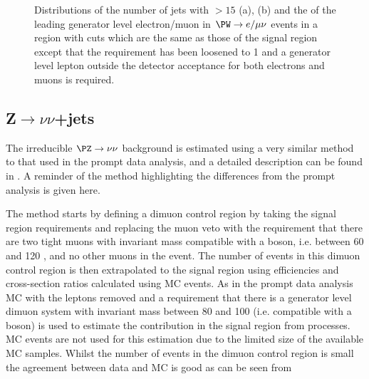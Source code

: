 \begin{figure}
  \caption{Distributions of the number of jets with \pt$>15$ \GeV (a), \jetmetdphi (b) and the \pt of the leading generator level electron/muon in $\PW\rightarrow e/\mu\nu$ events in a region with cuts which are the same as those of the signal region except that the \jetmetdphi requirement has been loosened to 1 and a generator level lepton outside the detector acceptance for both electrons and muons is required.}
  \label{fig:enumunudiff}
\end{figure}

\subsection{Z$\rightarrow \nu\nu$+jets}
\label{sec:parkedznunu}
The irreducible $\PZ\rightarrow\nu\nu$ background is estimated using a very similar method to that used in the prompt data analysis, and a detailed description can be found in . A reminder of the method highlighting the differences from the prompt analysis is given here.

The method starts by defining a dimuon control region by taking the signal region requirements and replacing the muon veto with the requirement that there are two tight muons with invariant mass compatible with a \PZ boson, i.e. between 60 and 120 \GeV, and no other muons in the event. The number of events in this dimuon control region is then extrapolated to the signal region using efficiencies and cross-section ratios calculated using \ac{MC} events. As in the prompt data analysis \Zmumu \ac{MC} with the leptons removed and a requirement that there is a generator level dimuon system with invariant mass between 80 and 100 \GeV (i.e. compatible with a \PZ boson) is used to estimate the contribution in the signal region from \Znunu processes. \Znunu \ac{MC} events are not used for this estimation due to the limited size of the available \Znunu \ac{MC} samples. Whilst the number of events in the dimuon control region is small the agreement between data and \ac{MC} is good as can be seen from 

